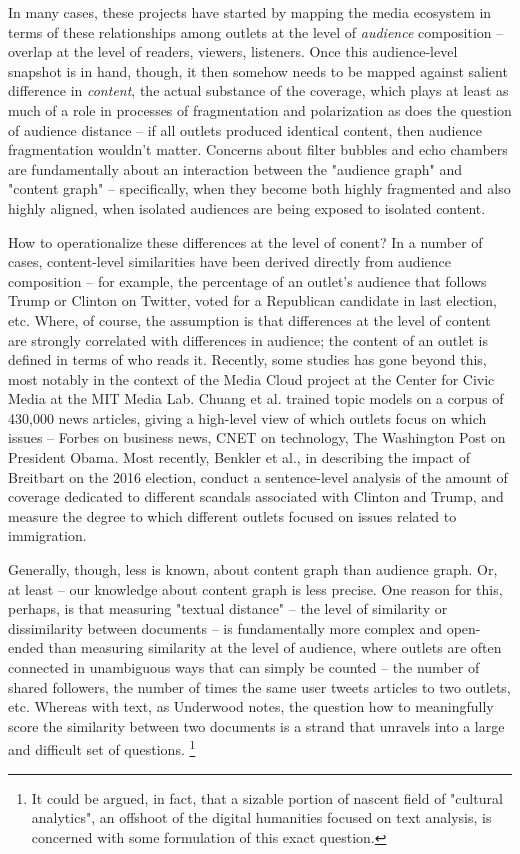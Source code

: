 \documentclass{scrartcl}
\begin{document}
In many cases, these projects have started by mapping the media ecosystem in terms of these relationships among outlets at the level of \textit{audience} composition -- overlap at the level of readers, viewers, listeners. Once this audience-level snapshot is in hand, though, it then somehow needs to be mapped against salient difference in \textit{content}, the actual substance of the coverage, which plays at least as much of a role in processes of fragmentation and polarization as does the question of audience distance -- if all outlets produced identical content, then audience fragmentation wouldn't matter. Concerns about filter bubbles and echo chambers are fundamentally about an interaction between the "audience graph" and "content graph" -- specifically, when they become both highly fragmented and also highly aligned, when isolated audiences are being exposed to isolated content.

How to operationalize these differences at the level of conent? In a number of cases, content-level similarities have been derived directly from audience composition -- for example, the percentage of an outlet's audience that follows Trump or Clinton on Twitter, voted for a Republican candidate in last election, etc. Where, of course, the assumption is that differences at the level of content are strongly correlated with differences in audience; the content of an outlet is defined in terms of who reads it. Recently, some studies has gone beyond this, most notably in the context of the Media Cloud project at the Center for Civic Media at the MIT Media Lab. Chuang et al. trained topic models on a corpus of 430,000 news articles, giving a high-level view of which outlets focus on which issues -- Forbes on business news, CNET on technology, The Washington Post on President Obama.\cite{chuang2014large} Most recently, Benkler et al., in describing the impact of Breitbart on the 2016 election, conduct a sentence-level analysis of the amount of coverage dedicated to different scandals associated with Clinton and Trump, and measure the degree to which different outlets focused on issues related to immigration.

Generally, though, less is known, about content graph than audience graph. Or, at least -- our knowledge about content graph is less precise. One reason for this, perhaps, is that measuring "textual distance" -- the level of similarity or dissimilarity between documents -- is fundamentally more complex and open-ended than measuring similarity at the level of audience, where outlets are often connected in unambiguous ways that can simply be counted -- the number of shared followers, the number of times the same user tweets articles to two outlets, etc. Whereas with text, as Underwood notes, the question how to meaningfully score the similarity between two documents is a strand that unravels into a large and difficult set of questions. \footnote{It could be argued, in fact, that a sizable portion of nascent field of "cultural analytics", an offshoot of the digital humanities focused on text analysis, is concerned with some formulation of this exact question.}
\end{document}
